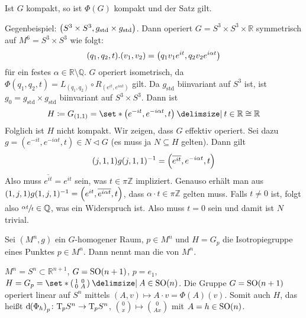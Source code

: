 \begin{beispiel*}[{name=[Gültigkeit von \autoref{lem:319}]}]
	Ist $G$ kompakt, so ist $\Phi(G)$ kompakt und der Satz gilt.
	
	Gegenbeispiel: $\enbrace*{S^3 \times S^3, g_{\mathrm{std}} \times g_{\mathrm{std}}}$. Dann operiert $G = S^3 \times S^3 \times \mathbb{R}$ symmetrisch auf $M^6=S^3 \times S^3$ wie folgt:
	\[
		(q_1,q_2,t).(v_1,v_2) = \enbrace*{q_1 v_1 e^{it}, q_2 v_2 e^{i \alpha t}}
	\]
	für ein festes $\alpha \in \mathbb{R} \setminus \mathbb{Q}$.
	$G$ operiert isometrisch, da $\Phi(q_1,q_2,t) = L_{(q_1,q_2)} \circ R_{(e^{it},e^{i \alpha t})}$ gilt.
	Da $g_{\mathrm{std}}$ biinvariant auf $S^3$ ist, ist $g_0 = g_{\mathrm{std}} \times g_{\mathrm{std}}$ biinvariant auf $S^3 \times S^3$.
	Dann ist 
	\[
		H \coloneqq G_{(1,1)} = \set*{\enbrace*{e^{-it}, e^{-i \alpha t}, t} \given t \in \mathbb{R}} \cong \mathbb{R}
	\]
	Folglich ist $H$ nicht kompakt.
	Wir zeigen, dass $G$ effektiv operiert.
	Sei dazu $g = (e^{-it}, e^{- i \alpha t}, t) \in N \lhd G$ (es muss ja $N \subseteq H$ gelten).
	Dann gilt
	\[
		(j,1,1) g (j,1,1)^{-1} = \enbrace*{\overline{e^{it}}, e^{- i \alpha t},t}
	\]
	Also muss $\overline{e^{i t}} = e^{it}$ sein, was $t \in \pi \mathbb{Z}$ impliziert.
	Genauso erhält man aus $(1,j,1)g(1,j,1)^{-1} = \enbrace*{e^{it}, \overline{e^{i \alpha t}},t}$, dass $\alpha \cdot t \in \pi \mathbb{Z}$ gelten muss.
	Falls $t \neq 0$ ist, folgt also $\sfrac{\alpha t}{t} \in \mathbb{Q}$, was ein Widerspruch ist.
	Also muss $t=0$ sein und damit ist $N$ trivial.
\end{beispiel*}

\begin{definition}[{name=[Isotropiedarstellung]}]
	Sei $(M^n,g)$ ein $G$-homogener Raum, $p \in M^n$ und $H= G_p$ die Isotropiegruppe eines Punktes $p \in M^n$.
	Dann nennt man
	die  von $M^n$.
\end{definition}

\begin{beispiel*}[{name=[Isotropiedarstellung]}]
	$M^n = S^n \subset \mathbb{R}^{n+1}$, $G = \SO(n+1)$, $p=e_1$, $H= G_p = \set*{\begin{psmallmatrix}
		1 & 0 \\ 0 & A
	\end{psmallmatrix} \given A \in \SO(n)}$.
	Die Gruppe $G = \SO(n+1)$ operiert linear auf $S^n$ mittels $(A,v) \mapsto A \cdot v = \Phi(A)(v)$.
	Somit auch $H$, das heißt $\mathd \enbrace*{\Phi_h}_p \colon \Tmap_p S^n \to \Tmap_p S^n$, $\binom{0}{x} \mapsto \binom{0}{Ax}$ mit $A=h \in \SO(n)$.
\end{beispiel*}

